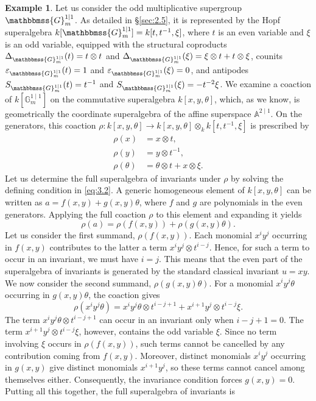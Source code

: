 \documentclass[11pt,a4paper,reqno,noamsfonts]{amsart}
\numberwithin{equation}{section}
\theoremstyle{definition}
\newtheorem{example}[theorem]{Example}
\theoremstyle{remark}
\newcommand{\GG}{\ensuremath{\mathbbmss{G}}}
\begin{document}
\begin{example}\label{ex:3.2}
Let us consider the odd multiplicative supergroup $\GG_{m}^{1 \vert 1}$. As detailed in \S\ref{sec:2.5}, it is represented by the Hopf superalgebra $k[\GG_m^{1\vert 1}] = k[t, t^{-1}, \xi]$, where $t$ is an even variable and $\xi$ is an odd variable, equipped with the structural coproducts $\Delta_{\GG_{m}^{1 \vert 1}}(t) = t \otimes t$ and $\Delta_{\GG_{m}^{1 \vert 1}}(\xi) = \xi \otimes t + t \otimes \xi$, counits $\varepsilon_{\GG_{m}^{1 \vert 1}}(t)=1$ and $\varepsilon_{\GG_{m}^{1 \vert 1}}(\xi) = 0$, and antipodes $S_{\GG_{m}^{1 \vert 1}}(t) = t^{-1}$ and $S_{\GG_{m}^{1 \vert 1}}(\xi) = - t^{-2} \xi$. We examine a coaction of $k[\mathbb G_m^{1\mid 1}]$ on the commutative superalgebra $k[x,y,\theta]$, which, as we know, is geometrically the coordinate superalgebra of the affine superspace $\mathbb A^{2\mid 1}$. On the generators, this coaction $\rho \colon k[x,y,\theta] \to k[x,y,\theta] \otimes_k k[t, t^{-1}, \xi]$ is prescribed by
$$
\begin{aligned}
\rho (x)&=x\otimes t,\\ 
\rho (y)&=y\otimes t^{-1},\\ 
\rho (\theta )&=\theta \otimes t+x\otimes \xi.
\end{aligned}
$$
Let us determine the full superalgebra of invariants under $\rho$ by solving the defining condition in \eqref{eq:3.2}. A generic homogeneous element of $k[x,y,\theta]$ can be written as $a = f(x,y) + g(x,y)\theta$, where $f$ and $g$ are polynomials in the even generators. Applying the full coaction $\rho$ to this element and expanding it yields
$$
\rho(a) = \rho(f(x,y)) + \rho(g(x,y) \theta). 
$$
Let us consider the first summand, $\rho(f(x,y))$. Each monomial $x^{i} y^{j}$ occurring in $f(x,y)$ contributes to the latter a term $x^{i} y^{j} \otimes t^{i-j}$. Hence, for such a term to occur in an invariant, we must have $i=j$. This means that the even part of the superalgebra of invariants is generated by the standard classical invariant $u = xy$. We now consider the second summand, $\rho(g(x,y) \theta)$. For a monomial $x^{i} y^{j} \theta$ occurring in $g(x,y) \theta$, the coaction gives
$$
\rho(x^{i} y^{j} \theta) = x^{i} y^{j} \theta \otimes t^{i-j+1} + x^{i+1} y^{j}  \otimes  t^{i-j} \xi.
$$
The term $x^{i} y^{j} \theta \otimes t^{i-j+1}$ can occur in an invariant only when $i- j + 1 =0$. The term $x^{i+1} y^{j}  \otimes  t^{i-j} \xi$, however, contains the odd variable $\xi$. Since no term involving $\xi$ occurs in $\rho(f(x,y))$, such terms cannot be cancelled by any contribution coming from $f(x,y)$. Moreover, distinct monomials $x^{i} y^{j}$ occurring in $g(x,y)$ give distinct monomials $x^{i+1} y^{j}$, so these terms cannot cancel among themselves either. Consequently, the invariance condition forces $g(x,y) = 0$. Putting all this together, the full superalgebra of invariants is

\end{example}
\end{document}
